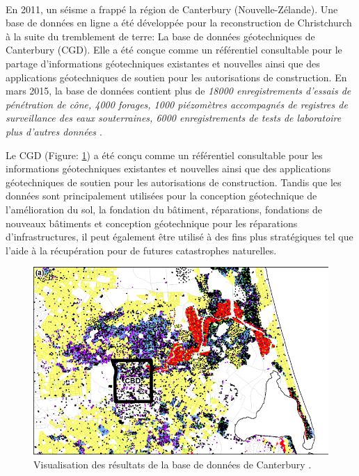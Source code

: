 
\paragraph{}
En 2011, un séisme a frappé la région de Canterbury (Nouvelle-Zélande). Une base de données en ligne a été développée pour
la reconstruction de Christchurch à la suite du tremblement de terre:
La base de données géotechniques de Canterbury (CGD). Elle
a été conçue comme un référentiel consultable pour le partage d'informations géotechniques existantes et nouvelles
ainsi que des applications géotechniques de soutien pour les autorisations de construction. En mars
2015, la base de données contient plus de \textit{18000 enregistrements d'essais de pénétration de cône, 4000 forages, 1000
piézomètres accompagnés de registres de surveillance des eaux souterraines, 6000 enregistrements de tests de laboratoire
plus d'autres données \cite{scott2015benefits}}. 

\par
Le CGD (Figure: \ref{fig:canterbury}) 
a été conçu comme un référentiel consultable pour les informations géotechniques existantes et nouvelles
ainsi que des applications géotechniques de soutien pour les autorisations de construction. Tandis que
les données sont principalement utilisées pour la conception géotechnique de l'amélioration du sol, la fondation du bâtiment,
réparations, fondations de nouveaux bâtiments et conception géotechnique pour les réparations d'infrastructures, il peut
également être utilisé à des fins plus stratégiques tel que l'aide à la récupération pour de futures
catastrophes naturelles.
\cite{scott2015benefits}

\begin{figure}[t]
    \centering
    \includegraphics[width=1\textwidth]{images/Contexte/cgd.png}
    \caption{Visualisation des résultats de la base de données de Canterbury \cite{scott2015benefits}.}
    \label{fig:canterbury}
\end{figure}

